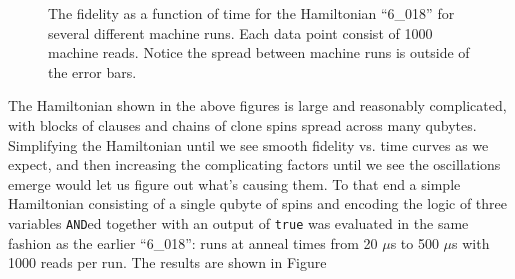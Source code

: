 \begin{figure}
	\caption[Short Time Fidelities]{The fidelity as a function of time for the Hamiltonian ``6\_018'' for several different machine runs.  Each data point consist of 1000 machine reads.  Notice the spread between machine runs is outside of the error bars.}
	\label{fig:short_fidelity}
\end{figure}

The Hamiltonian shown in the above figures is large and reasonably complicated, with blocks of clauses and chains of clone spins spread across many qubytes.  Simplifying the Hamiltonian until we see smooth fidelity vs. time curves as we expect, and then increasing the complicating factors until we see the oscillations emerge would let us figure out what's causing them.  To that end a simple Hamiltonian consisting of a single qubyte of spins and encoding the logic of three variables \texttt{AND}ed together with an output of \texttt{true} was evaluated in the same fashion as the earlier ``6\_018'': runs at anneal times from 20 $\mu$s to 500 $\mu$s with 1000 reads per run.  The results are shown in Figure 

